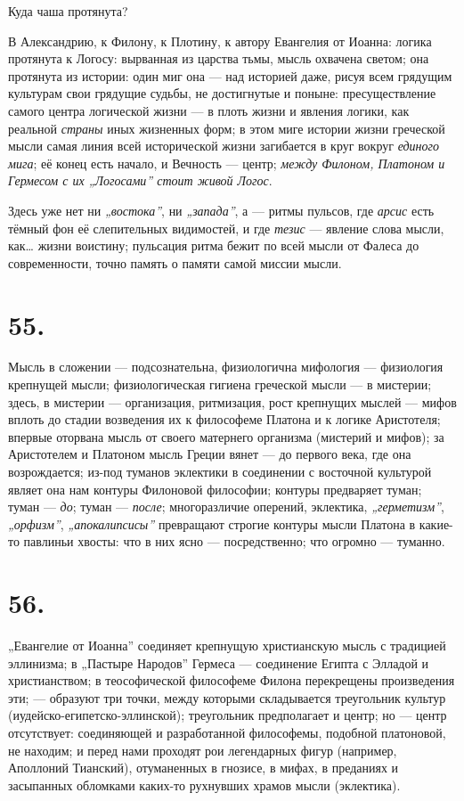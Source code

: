 \documentclass[12pt,a4paper,oneside]{book}
\begin{document}
Куда чаша протянута?

В Александрию, к Филону, к Плотину, к автору Евангелия от Иоанна: логика протянута к Логосу: вырванная из царства тьмы, мысль охвачена светом; она протянута из истории: один миг она — над историей даже, рисуя всем грядущим культурам свои грядущие судьбы, не достигнутые и поныне: пресуществление самого центра логической жизни — в плоть жизни и явления логики, как реальной \emph{страны} иных жизненных форм; в этом миге истории жизни греческой мысли самая линия всей исторической жизни загибается в круг вокруг \emph{единого мига}; её конец есть начало, и Вечность — центр; \emph{между Филоном, Платоном и Гермесом с их „Логосами” стоит живой Логос}.

Здесь уже нет ни \emph{„востока”}, ни \emph{„запада”}, а — ритмы пульсов, где \emph{арсис} есть тёмный фон её слепительных видимостей, и где \emph{тезис} — явление слова мысли, как… жизни воистину; пульсация ритма бежит по всей мысли от Фалеса до современности, точно память о памяти самой миссии мысли.

\section*{55.}

Мысль в сложении — подсознательна, физиологична мифология — физиология крепнущей мысли; физиологическая гигиена греческой мысли — в мистерии; здесь, в мистерии — организация, ритмизация, рост крепнущих мыслей — мифов вплоть до стадии возведения их к философеме Платона и к логике Аристотеля; впервые оторвана мысль от своего матернего организма (мистерий и мифов); за Аристотелем и Платоном мысль Греции вянет — до первого века, где она возрождается; из-под туманов эклектики в соединении с восточной культурой являет она нам контуры Филоновой философии; контуры предваряет туман; туман — \emph{до}; туман — \emph{после}; многоразличие оперений, эклектика, \emph{„герметизм”}, \emph{„орфизм”}, \emph{„апокалипсисы”} превращают строгие контуры мысли Платона в какие-то павлиньи хвосты: что в них ясно — посредственно; что огромно — туманно.

\section*{56.}

„Евангелие от Иоанна” соединяет крепнущую христианскую мысль с традицией эллинизма; в „Пастыре Народов” Гермеса — соединение Египта с Элладой и христианством; в теософической философеме Филона перекрещены произведения эти; — образуют три точки, между которыми складывается треугольник культур (иудейско-египетско-эллинской); треугольник предполагает и центр; но — центр отсутствует: соединяющей и разработанной философемы, подобной платоновой, не находим; и перед нами проходят рои легендарных фигур (например, Аполлоний Тианский), отуманенных в гнозисе, в мифах, в преданиях и засыпанных обломками каких-то рухнувших храмов мысли (эклектика).
\end{document}
